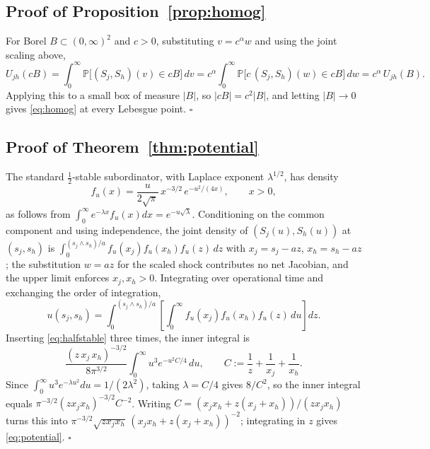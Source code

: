 \documentclass{ws-ijtaf}
\newcommand{\PP}{\mathbb{P}}
\providecommand{\qed}{\hfill\ensuremath{\square}}
\begin{document}
\subsection*{Proof of Proposition~\ref{prop:homog}}

For Borel $B\subset(0,\infty)^2$ and $c>0$, substituting $v=c^{\alpha}w$ and
using the joint scaling above,
\begin{equation}
U_{jh}(cB) = \int_0^\infty \PP\big[(S_j,S_h)(v)\in cB\big]\,dv
= c^{\alpha}\!\int_0^\infty \PP\big[c\,(S_j,S_h)(w)\in cB\big]\,dw
= c^{\alpha}\,U_{jh}(B).
\end{equation}
Applying this to a small box of measure $|B|$, so $|cB|=c^2|B|$, and letting
$|B|\to0$ gives \eqref{eq:homog} at every Lebesgue point. \qed

\subsection*{Proof of Theorem~\ref{thm:potential}}

The standard $\tfrac12$-stable subordinator, with Laplace exponent
$\lambda^{1/2}$, has density
\begin{equation}
f_u(x) = \frac{u}{2\sqrt{\pi}}\,x^{-3/2}\,e^{-u^{2}/(4x)},
\qquad x>0,
\label{eq:halfstable}
\end{equation}
as follows from $\int_0^\infty e^{-\lambda x}f_u(x)dx = e^{-u\sqrt\lambda}$.
Conditioning on the common component and using independence, the joint density
of $(S_j(u),S_h(u))$ at $(s_j,s_h)$ is
$\int_0^{(s_j\wedge s_h)/a} f_u(x_j)f_u(x_h)f_u(z)\,dz$ with $x_j=s_j-az$,
$x_h=s_h-az$; the substitution $w=az$ for the scaled shock contributes no net
Jacobian, and the upper limit enforces $x_j,x_h>0$. Integrating over operational
time and exchanging the order of integration,
\begin{equation}
u(s_j,s_h) = \int_0^{(s_j\wedge s_h)/a}
\left[\int_0^\infty f_u(x_j)f_u(x_h)f_u(z)\,du\right] dz .
\end{equation}
Inserting \eqref{eq:halfstable} three times, the inner integral is
\begin{equation}
\frac{(z\,x_j\,x_h)^{-3/2}}{8\pi^{3/2}}
\int_0^\infty u^{3} e^{-u^{2}C/4}\,du,
\qquad
C := \frac1z + \frac1{x_j} + \frac1{x_h}.
\end{equation}
Since $\int_0^\infty u^3 e^{-\lambda u^2}du = 1/(2\lambda^2)$, taking
$\lambda=C/4$ gives $8/C^{2}$, so the inner integral equals
$\pi^{-3/2}(z x_j x_h)^{-3/2} C^{-2}$. Writing
$C = (x_jx_h + z(x_j+x_h))/(z x_j x_h)$ turns this into
$\pi^{-3/2}\sqrt{z x_j x_h}\,(x_jx_h+z(x_j+x_h))^{-2}$; integrating in $z$ gives
\eqref{eq:potential}. \qed
\end{document}

